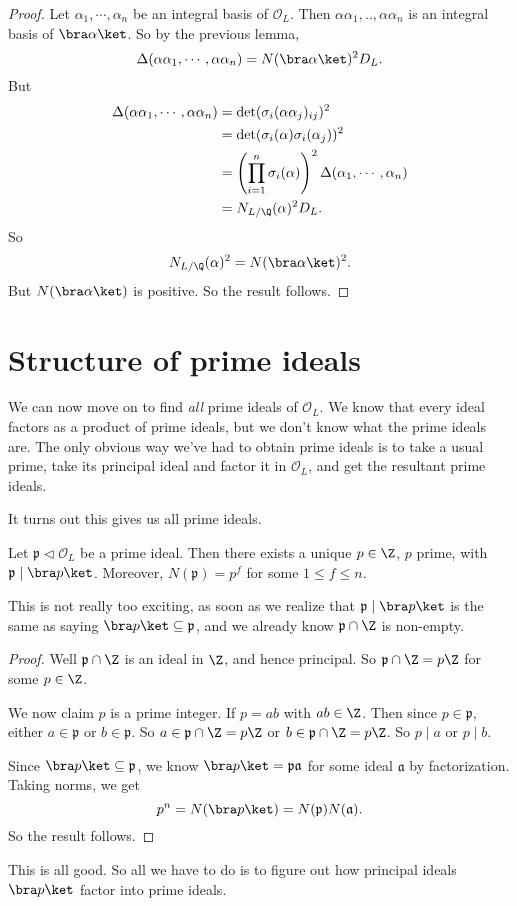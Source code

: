 \documentclass[a4paper]{article}
\begin{document}
\begin{proof}
  Let $\alpha_1, \cdots, \alpha_n$ be an integral basis of $\mathcal{O}_L$. Then $\alpha\alpha_1, .., \alpha\alpha_n$ is an integral basis of $\bra \alpha\ket$. So by the previous lemma,
  \[
    \Delta(\alpha \alpha_1, \cdots, \alpha\alpha_n) = N(\bra \alpha\ket)^2 D_L.
  \]
  But
  \begin{align*}
    \Delta (\alpha \alpha_1, \cdots, \alpha\alpha_n) &= \det(\sigma_i(\alpha\alpha_j)_{ij})^2 \\
    &= \det(\sigma_i(\alpha)\sigma_i(\alpha_j))^2\\
    &= \left(\prod_{i = 1}^n \sigma_i(\alpha)\right)^2 \Delta(\alpha_1, \cdots, \alpha_n)\\
    &= N_{L/\Q}(\alpha)^2 D_L.
  \end{align*}
  So
  \[
    N_{L/\Q}(\alpha)^2 = N(\bra \alpha\ket)^2.
  \]
  But $N(\bra \alpha\ket)$ is positive. So the result follows.
\end{proof}

\section{Structure of prime ideals}
We can now move on to find \emph{all} prime ideals of $\mathcal{O}_L$. We know that every ideal factors as a product of prime ideals, but we don't know what the prime ideals are. The only obvious way we've had to obtain prime ideals is to take a usual prime, take its principal ideal and factor it in $\mathcal{O}_L$, and get the resultant prime ideals.

It turns out this gives us all prime ideals.
\begin{lemma}
  Let $\mathfrak{p} \lhd \mathcal{O}_L$ be a prime ideal. Then there exists a unique $p \in \Z$, $p$ prime, with $\mathfrak{p} \mid \bra p\ket$. Moreover, $N(\mathfrak{p}) = p^f$ for some $1 \leq f \leq n$.
\end{lemma}
This is not really too exciting, as soon as we realize that $\mathfrak{p} \mid \bra p\ket$ is the same as saying $\bra p\ket \subseteq \mathfrak{p}$, and we already know $\mathfrak{p} \cap \Z$ is non-empty.

\begin{proof}
  Well $\mathfrak{p} \cap \Z$ is an ideal in $\Z$, and hence principal. So $\mathfrak{p} \cap \Z = p\Z$ for some $p \in \Z$.

  We now claim $p$ is a prime integer. If $p = ab$ with $ab \in \Z$. Then since $p \in \mathfrak{p}$, either $a \in \mathfrak{p}$ or $b \in \mathfrak{p}$. So $a \in \mathfrak{p} \cap \Z = p\Z$ or $b \in \mathfrak{p} \cap \Z = p\Z$. So $p \mid a$ or $p \mid b$.

  Since $\bra p\ket \subseteq \mathfrak{p}$, we know $\bra p\ket = \mathfrak{p}\mathfrak{a}$ for some ideal $\mathfrak{a}$ by factorization. Taking norms, we get
  \[
    p^n = N(\bra p\ket) = N(\mathfrak{p}) N(\mathfrak{a}).
  \]
  So the result follows.
\end{proof}
This is all good. So all we have to do is to figure out how principal ideals $\bra p\ket$ factor into prime ideals.
\end{document}
